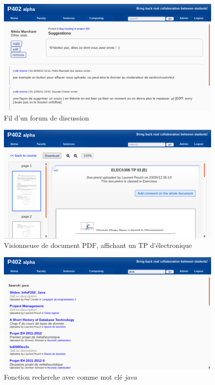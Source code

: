 \documentclass[a4paper,12pt]{article}
\begin{document}
\begin{figure}
  \centering\includegraphics[scale=0.5]{imgs/forum.pdf}
  \caption{Fil d'un forum de discussion}
  \label{fig:forum}
\end{figure}

\begin{figure}
  \centering\includegraphics[scale=0.5]{imgs/viewer.pdf}
  \caption{Visionneuse de document PDF, affichant un TP d'électronique}
  \label{fig:viewer}
\end{figure}
	
\begin{figure}
  \centering\includegraphics[scale=0.5]{imgs/search.pdf}
  \caption{Fonction recherche avec comme mot clé \textit{java}}
  \label{fig:search}
\end{figure}
\end{document}
